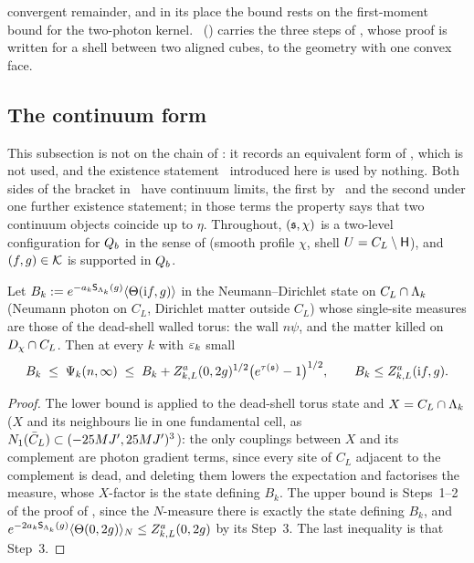 \begin{remark}
convergent remainder, and in its place the bound rests on the first-moment bound for the two-photon kernel. \DSh\ () carries the three steps of , whose proof is written for a shell between two aligned cubes, to the geometry with one convex face.
\end{remark}

\subsection{The continuum form}

This subsection is not on the chain of : it records an equivalent form of \REa, which is not used, and the existence statement \Einf\ introduced here is used by nothing. Both sides of the bracket in \REa\ have continuum limits, the first by \Ka\ and the second under one further existence statement; in those terms the property says that two continuum objects coincide up to $\eta$. Throughout, $(\mathfrak s,\chi)$ is a two-level configuration for $Q_{b}$ in the sense of  (smooth profile $\chi$, shell $U=C_L\setminus\mathsf H$), and $(f,g)\in\mathcal K$ is supported in $Q_{b}$.

\begin{proposition}\label{rot:prop:deadcube}
Let $B_k:= e^{-a_k\mathsf S_{\Lambda_k}(g)}\langle\Theta(\mathrm if,g)\rangle$ in the Neumann--Dirichlet state on $C_L\cap\Lambda_k$ (Neumann photon on $C_L$, Dirichlet matter outside $C_L$) whose single-site measures are those of the dead-shell walled torus: the wall $n\psi$, and the matter killed on $D_\chi\cap C_L$. Then at every $k$ with $\varepsilon_k$ small
\[
B_k\;\le\;\Psi_k(n,\infty)\;\le\;B_k+Z^a_{k,L}(0,2g)^{1/2}\big(e^{\tau(\mathfrak s)}-1\big)^{1/2},\qquad B_k\le Z^a_{k,L}(\mathrm if,g).
\]
\end{proposition}

\begin{proof}
The lower bound is  applied to the dead-shell torus state and $X=C_L\cap\Lambda_k$ ($X$ and its neighbours lie in one fundamental cell, as $N_{1}(\bar C_L)\subset(-25MJ',25MJ')^3$): the only couplings between $X$ and its complement are photon gradient terms, since every site of $C_L$ adjacent to the complement is dead, and deleting them lowers the expectation and factorises the measure, whose $X$-factor is the state defining $B_k$. The upper bound is Steps~1--2 of the proof of , since the $N$-measure there is exactly the state defining $B_k$, and $e^{-2a_k\mathsf S_{\Lambda_k}(g)}\langle\Theta(0,2g)\rangle_N\le Z^a_{k,L}(0,2g)$ by its Step~3. The last inequality is that Step~3.
\end{proof}

